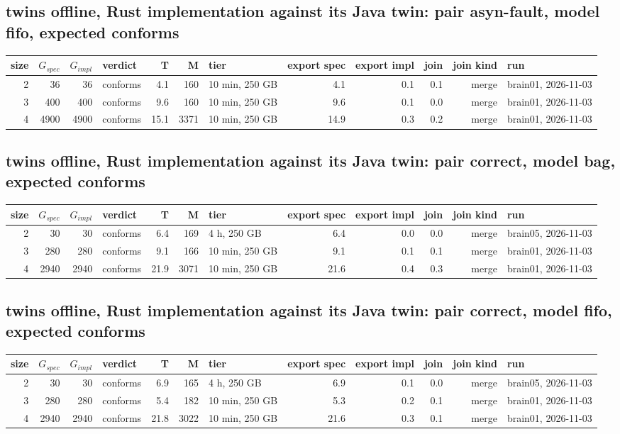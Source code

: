\documentclass[10pt]{article}
\begin{document}
\subsection*{twins offline, Rust implementation against its Java twin: pair \textsf{asyn-fault}, model fifo, expected conforms}
\begin{longtable}{@{}rrrlrrlrrrrl@{}}
\toprule
size & $G_{\mathit{spec}}$ & $G_{\mathit{impl}}$ & verdict & T & M & tier & export spec & export impl & join & join kind & run \\
\midrule
\endhead
\color{blue} 2 & 36 & 36 & conforms & 4.1 & 160 & 10 min, 250 GB & 4.1 & 0.1 & 0.1 & merge & brain01, 2026-11-03 \\
\color{blue} 3 & 400 & 400 & conforms & 9.6 & 160 & 10 min, 250 GB & 9.6 & 0.1 & 0.0 & merge & brain01, 2026-11-03 \\
\color{blue} 4 & 4900 & 4900 & conforms & 15.1 & 3371 & 10 min, 250 GB & 14.9 & 0.3 & 0.2 & merge & brain01, 2026-11-03 \\
\bottomrule
\end{longtable}
\subsection*{twins offline, Rust implementation against its Java twin: pair \textsf{correct}, model bag, expected conforms}
\begin{longtable}{@{}rrrlrrlrrrrl@{}}
\toprule
size & $G_{\mathit{spec}}$ & $G_{\mathit{impl}}$ & verdict & T & M & tier & export spec & export impl & join & join kind & run \\
\midrule
\endhead
\color{blue} 2 & 30 & 30 & conforms & 6.4 & 169 & 4 h, 250 GB & 6.4 & 0.0 & 0.0 & merge & brain05, 2026-11-03 \\
\color{blue} 3 & 280 & 280 & conforms & 9.1 & 166 & 10 min, 250 GB & 9.1 & 0.1 & 0.1 & merge & brain01, 2026-11-03 \\
\color{blue} 4 & 2940 & 2940 & conforms & 21.9 & 3071 & 10 min, 250 GB & 21.6 & 0.4 & 0.3 & merge & brain01, 2026-11-03 \\
\bottomrule
\end{longtable}
\subsection*{twins offline, Rust implementation against its Java twin: pair \textsf{correct}, model fifo, expected conforms}
\begin{longtable}{@{}rrrlrrlrrrrl@{}}
\toprule
size & $G_{\mathit{spec}}$ & $G_{\mathit{impl}}$ & verdict & T & M & tier & export spec & export impl & join & join kind & run \\
\midrule
\endhead
\color{blue} 2 & 30 & 30 & conforms & 6.9 & 165 & 4 h, 250 GB & 6.9 & 0.1 & 0.0 & merge & brain05, 2026-11-03 \\
\color{blue} 3 & 280 & 280 & conforms & 5.4 & 182 & 10 min, 250 GB & 5.3 & 0.2 & 0.1 & merge & brain01, 2026-11-03 \\
\color{blue} 4 & 2940 & 2940 & conforms & 21.8 & 3022 & 10 min, 250 GB & 21.6 & 0.3 & 0.1 & merge & brain01, 2026-11-03 \\
\bottomrule
\end{longtable}
\end{document}
